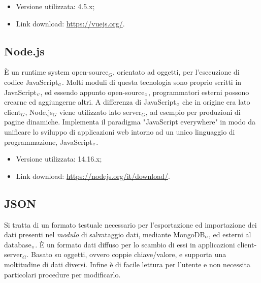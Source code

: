 \begin{itemize}
  \item Versione utilizzata: 4.5.x;
  \item Link download: \url{https://vuejs.org/}.
\end{itemize}

\subsection{Node.js}\label{TecnologieNode}
È un runtime system open-source$_G$, orientato ad oggetti, per l'esecuzione di codice JavaScript$_{\scaleto{G}{3pt}}$.
Molti moduli di questa tecnologia sono proprio scritti in JavaScript$_{\scaleto{G}{3pt}}$, ed essendo appunto open-source$_{\scaleto{G}{3pt}}$, programmatori esterni possono crearne ed aggiungerne altri.
A differenza di JavaScript$_{\scaleto{G}{3pt}}$ che in origine era lato client$_G$, Node.js$_G$ viene utilizzato lato server$_G$, ad esempio per produzioni di pagine dinamiche.
Implementa il paradigma "JavaScript everywhere" in modo da unificare lo sviluppo di applicazioni web intorno ad un unico linguaggio di programmazione, JavaScript$_{\scaleto{G}{3pt}}$.

\begin{itemize}
  \item Versione utilizzata: 14.16.x;
  \item Link download: \url{https://nodejs.org/it/download/}.
\end{itemize}


\subsection{JSON}\label{TecnologieJson}
Si tratta di un formato testuale necessario per l'esportazione ed importazione dei dati presenti nel \textit{modulo} di salvataggio dati, mediante MongoDB$_{\scaleto{G}{3pt}}$, ed esterni al database$_{\scaleto{G}{3pt}}$.
È un formato dati diffuso per lo scambio di essi in applicazioni client-server$_G$.
Basato su oggetti, ovvero coppie chiave/valore, e supporta una moltitudine di dati diversi. Infine è di facile lettura per l'utente e non necessita particolari procedure per modificarlo.
